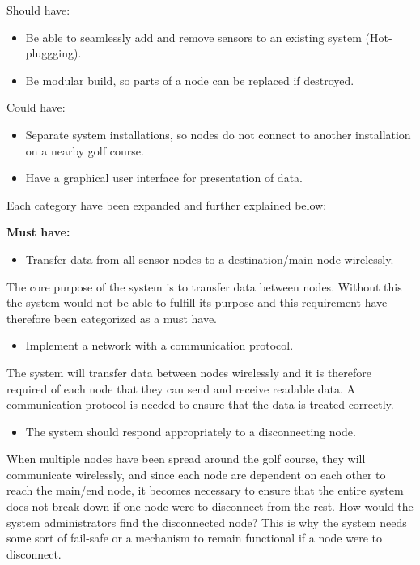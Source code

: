 Should have:
\begin{itemize}
\item Be able to seamlessly add and remove sensors to an existing system (Hot-pluggging).
\item Be modular build, so parts of a node can be replaced if destroyed.
\end{itemize}

Could have:
\begin{itemize}
\item Separate system installations, so nodes do not connect to another installation on a nearby golf course.
\item Have a graphical user interface for presentation of data.
\end{itemize}


Each category have been expanded and further explained below:

\textbf{Must have:}
\begin{itemize}
\item Transfer data from all sensor nodes to a destination/main node wirelessly.
\end{itemize}
The core purpose of the system is to transfer data between nodes. Without this the system would not be able to fulfill its purpose and this requirement have therefore been categorized as a must have.


\begin{itemize}
\item Implement a network with a communication protocol.
\end{itemize}
The system will transfer data between nodes wirelessly and it is therefore required of each node that they can send and receive readable data. A communication protocol is needed to ensure that the data is treated correctly.


\begin{itemize}
\item The system should respond appropriately to a disconnecting node.
\end{itemize}
When multiple nodes have been spread around the golf course, they will communicate wirelessly, and since each node are dependent on each other to reach the main/end node, it becomes necessary to ensure that the entire system does not break down if one node were to disconnect from the rest. How would the system administrators find the disconnected node? This is why the system needs some sort of fail-safe or a mechanism to remain functional if a node were to disconnect.


